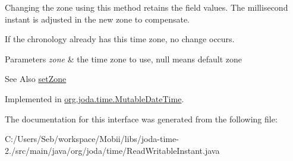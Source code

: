 Changing the zone using this method retains the field values. The millisecond instant is adjusted in the new zone to compensate. 

If the chronology already has this time zone, no change occurs.


\begin{DoxyParams}{Parameters}
{\em zone} & the time zone to use, null means default zone \\
\hline
\end{DoxyParams}
\begin{DoxySeeAlso}{See Also}
\hyperlink{interfaceorg_1_1joda_1_1time_1_1_read_writable_instant_adcb4582ac7c3e9f44628ac0a78bf09cd}{set\-Zone} 
\end{DoxySeeAlso}


Implemented in \hyperlink{classorg_1_1joda_1_1time_1_1_mutable_date_time_aefcb4cd4480695acef00d3ab96d009d3}{org.\-joda.\-time.\-Mutable\-Date\-Time}.



The documentation for this interface was generated from the following file\-:\begin{DoxyCompactItemize}
\item 
C\-:/\-Users/\-Seb/workspace/\-Mobii/libs/joda-\/time-\/2./src/main/java/org/joda/time/Read\-Writable\-Instant.\-java\end{DoxyCompactItemize}
